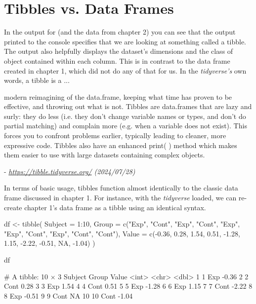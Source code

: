 \section{Tibbles vs. Data Frames}

In the output for  (and the  data from chapter 2) you can see that the output printed to the console specifies that we are looking at something called a \gls{tibble}. The output also helpfully displays the dataset's dimensions and the class of object contained within each column. This is in contrast to the data frame created in chapter 1, which did not do any of that for us. In the \textit{tidyverse's} own words, a tibble is a ...

\begin{displayquote}
\headingfont
modern reimagining of the data.frame, keeping what time has proven to be effective, and throwing out what is not. Tibbles are data.frames that are lazy and surly: they do less (i.e. they don’t change variable names or types, and don’t do partial matching) and complain more (e.g. when a variable does not exist). This forces you to confront problems earlier, typically leading to cleaner, more expressive code. Tibbles also have an enhanced print( ) method which makes them easier to use with large datasets containing complex objects.

- \textit{\url{https://tibble.tidyverse.org/} (2024/07/28)}

\end{displayquote}

In terms of basic usage, tibbles function almost identically to the classic data frame discussed in chapter 1. For instance, with the \textit{tidyverse} loaded, we can re-create chapter 1's data frame as a tibble using an identical syntax.

\begin{inR}
df <- tibble(
  Subject = 1:10,
  Group = c("Exp", "Cont", "Exp", "Cont", "Exp", "Exp",
            "Cont", "Exp", "Cont", "Cont"),
  Value = c(-0.36,  0.28,  1.54,  0.51, -1.28,  1.15,
            -2.22, -0.51,  NA, -1.04)
)

df
\end{inR}

\begin{outR}
# A tibble: 10 × 3
   Subject Group Value
     <int> <chr> <dbl>
 1       1 Exp   -0.36
 2       2 Cont   0.28
 3       3 Exp    1.54
 4       4 Cont   0.51
 5       5 Exp   -1.28
 6       6 Exp    1.15
 7       7 Cont  -2.22
 8       8 Exp   -0.51
 9       9 Cont  NA   
10      10 Cont  -1.04
\end{outR}

